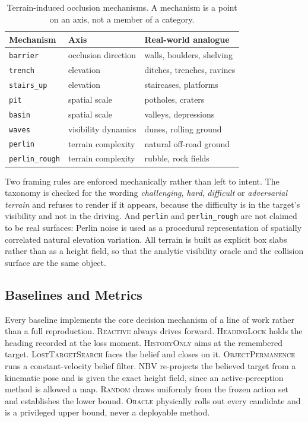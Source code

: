 \documentclass[conference]{IEEEtran}
\begin{document}
\begin{table}[t]
\caption{Terrain-induced occlusion mechanisms. A mechanism is a point on an axis, not
a member of a category.}
\label{tab:mechanisms}
\centering
\small
\begin{tabular}{@{}lll@{}}
\toprule
Mechanism & Axis & Real-world analogue\\
\midrule
\texttt{barrier}       & occlusion direction & walls, boulders, shelving\\
\texttt{trench}        & elevation           & ditches, trenches, ravines\\
\texttt{stairs\_up}    & elevation           & staircases, platforms\\
\texttt{pit}           & spatial scale       & potholes, craters\\
\texttt{basin}         & spatial scale       & valleys, depressions\\
\texttt{waves}         & visibility dynamics & dunes, rolling ground\\
\texttt{perlin}        & terrain complexity  & natural off-road ground\\
\texttt{perlin\_rough} & terrain complexity  & rubble, rock fields\\
\bottomrule
\end{tabular}
\end{table}

Two framing rules are enforced mechanically rather than left to intent. The taxonomy
is checked for the wording \emph{challenging}, \emph{hard}, \emph{difficult} or
\emph{adversarial terrain} and refuses to render if it appears, because the difficulty
is in the target's visibility and not in the driving. And \texttt{perlin} and
\texttt{perlin\_rough} are not claimed to be real surfaces: Perlin noise is used as a
procedural representation of spatially correlated natural elevation variation. All
terrain is built as explicit box slabs rather than as a height field, so that the
analytic visibility oracle and the collision surface are the same object.

\subsection{Baselines and Metrics}

Every baseline implements the core decision mechanism of a line of work rather than a
full reproduction. \textsc{Reactive} always drives forward. \textsc{HeadingLock} holds
the heading recorded at the loss moment. \textsc{HistoryOnly} aims at the remembered
target. \textsc{LostTargetSearch} faces the belief and closes on it.
\textsc{ObjectPermanence} runs a constant-velocity belief filter. \textsc{NBV}
re-projects the believed target from a kinematic pose and is given the exact height
field, since an active-perception method is allowed a map. \textsc{Random} draws
uniformly from the frozen action set and establishes the lower bound.
\textsc{Oracle} physically rolls out every candidate and is a privileged upper bound,
never a deployable method.
\end{document}

